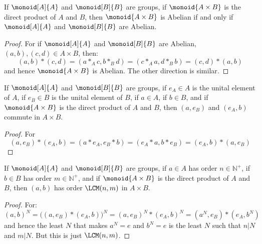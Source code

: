     \begin{theorem}
        If $\monoid[A]{A}$ and $\monoid[B]{B}$ are groups, if
        $\monoid{A\times{B}}$ is the direct product of $A$ and $B$, then
        $\monoid{A\times{B}}$ is Abelian if and only if
        $\monoid[A]{A}$ and $\monoid[B]{B}$ are Abelian.
    \end{theorem}
    \begin{proof}
        For if $\monoid[A]{A}$ and $\monoid[B]{B}$ are Abelian,
        $(a,b),(c,d)\in{A}\times{B}$, then:
        \begin{equation}
            (a,b)*(c,d)=(a*_{A}c,b*_{B}d)=
            (c*_{A}a,d*_{B}b )=(c,d)*(a,b)
        \end{equation}
        and hence $\monoid{A\times{B}}$ is Abelian. The other direction is
        similar.
    \end{proof}
    \begin{theorem}
        If $\monoid[A]{A}$ and $\monoid[B]{B}$ are groups, if $e_{A}\in{A}$
        is the unital element of $A$, if $e_{B}\in{B}$ is the unital element
        of $B$, if $a\in{A}$, if $b\in{B}$, and if $\monoid{A\times{B}}$
        is the direct product of $A$ and $B$, then $(a,e_{B})$ and
        $(e_{A},b)$ commute in $A\times{B}$.
    \end{theorem}
    \begin{proof}
        For
        \begin{equation}
            (a,e_{B})*(e_{A},b)=(a*e_{A},e_{B}*b)
            =(e_{A}*a,b*e_{B})=(e_{A},b)*(a,e_{B})
        \end{equation}
    \end{proof}
    \begin{theorem}
        If $\monoid[A]{A}$ and $\monoid[B]{B}$ are groups, if $a\in{A}$ has
        order $n\in\mathbb{N}^{+}$, if $b\in{B}$ has order
        $m\in\mathbb{N}^{+}$, and if $\monoid{A\times{B}}$ is the direct
        product of $A$ and $B$, then $(a,b)$ has order $\LCM(n,m)$ in
        $A\times{B}$.
    \end{theorem}
    \begin{proof}
        For:
        \begin{equation}
            (a,b)^{N}=\big((a,e_{B})*(e_{A},b)\big)^{N}
            =(a,e_{B})^{N}*(e_{A},b)^{N}
            =(a^{N},e_{B})*(e_{A},b^{N})
        \end{equation}
        and hence the least $N$ that makes $a^{N}=e$ and $b^{N}=e$ is the
        least $N$ such that $n|N$ and $m|N$. But this is just $\LCM(n,m)$.
    \end{proof}
